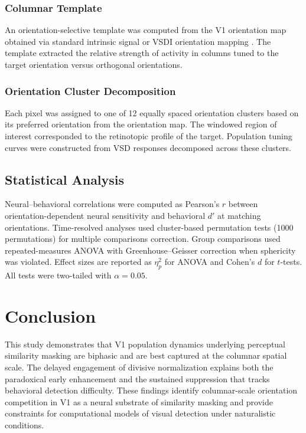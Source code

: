 \documentclass[11pt]{article}
\begin{document}
\subsubsection{Columnar Template}
An orientation-selective template was computed from the V1 orientation map obtained via standard intrinsic signal or VSDI orientation mapping \citep{blasdel1986}. The template extracted the relative strength of activity in columns tuned to the target orientation versus orthogonal orientations.

\subsubsection{Orientation Cluster Decomposition}
Each pixel was assigned to one of 12 equally spaced orientation clusters based on its preferred orientation from the orientation map. The windowed region of interest corresponded to the retinotopic profile of the target. Population tuning curves were constructed from VSD responses decomposed across these clusters.

\subsection{Statistical Analysis}

Neural--behavioral correlations were computed as Pearson's $r$ between orientation-dependent neural sensitivity and behavioral $d'$ at matching orientations. Time-resolved analyses used cluster-based permutation tests (1000 permutations) for multiple comparisons correction. Group comparisons used repeated-measures ANOVA with Greenhouse--Geisser correction when sphericity was violated. Effect sizes are reported as $\eta_p^2$ for ANOVA and Cohen's $d$ for $t$-tests. All tests were two-tailed with $\alpha = 0.05$.

\section{Conclusion}

This study demonstrates that V1 population dynamics underlying perceptual similarity masking are biphasic and are best captured at the columnar spatial scale. The delayed engagement of divisive normalization explains both the paradoxical early enhancement and the sustained suppression that tracks behavioral detection difficulty. These findings identify columnar-scale orientation competition in V1 as a neural substrate of similarity masking and provide constraints for computational models of visual detection under naturalistic conditions.



\end{document}
